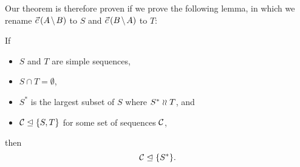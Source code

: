 Our theorem is therefore proven if we prove the following lemma,
in which we rename $\amb$ to $S$ and $\bma$ to $T$:
\newcommand{\condSimple}{(c1)}
\newcommand{\condDisj}{(c2)}
\newcommand{\condApr}{(c3)}
\newcommand{\condWork}{(c4)}
\begin{mylem}\label{reconciliation_correct_part}
If
   \begin{itemize}
   \item[\condSimple] $S$ and $T$ are simple sequences,
   \item[\condDisj] $S\cap T=\emptyset$,
   \item[\condApr] $S^*$ is the largest subset of $S$ where $S^*\mathrel{\wr\wr} T$, and
   \item[\condWork] ${\mathcal{C}}\trianglelefteq{\{{S,T}\}}$ for some set of sequences $\mathcal{C}$,
   \end{itemize}
then
\[ {\mathcal{C}}\trianglelefteq{\{{S^*}\}}. \]
\end{mylem}

